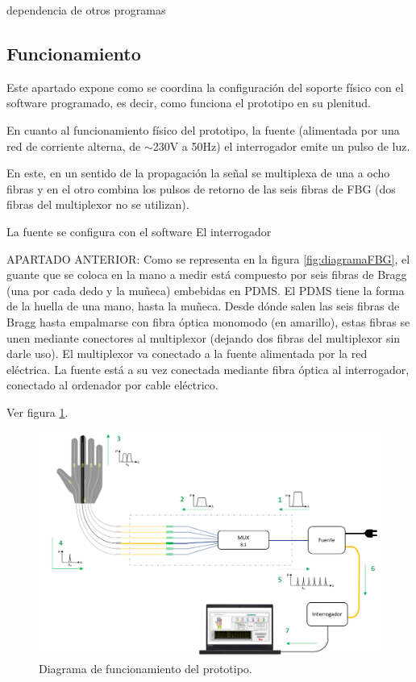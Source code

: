 






dependencia de otros programas


\subsection{Funcionamiento}
\label{sec:funcionamiento3}


Este apartado expone como se coordina la configuración del soporte físico con el software programado, es decir, como funciona el prototipo en su plenitud.

En cuanto al funcionamiento físico del prototipo, la fuente  (alimentada por una red de corriente alterna, de $\sim$230V a 50Hz) el interrogador emite un pulso de luz. 



En este, en un sentido de la propagación la señal se multiplexa de una a ocho fibras y en el otro combina los pulsos de retorno de las seis fibras de FBG (dos fibras del multiplexor no se utilizan). 

La fuente se configura con el software 
El interrogador


APARTADO ANTERIOR: 	Como se representa en la figura \ref{fig:diagramaFBG}, el guante que se coloca en la mano a medir está compuesto por seis fibras de Bragg (una por cada dedo y la muñeca) embebidas en PDMS. El PDMS tiene la forma de la huella de una mano, hasta la muñeca. Desde dónde salen las seis fibras de Bragg hasta empalmarse con fibra óptica monomodo (en amarillo), estas fibras se unen mediante conectores al multiplexor (dejando dos fibras del multiplexor sin darle uso). El multiplexor va conectado a la fuente alimentada por la red eléctrica. La fuente está a su vez conectada mediante fibra óptica al interrogador, conectado al ordenador por cable eléctrico.

Ver figura \ref{fig:diagramaFBGfuncionamiento}.

\begin{figure}[H]
	\centering
	\includegraphics[width=1\textwidth]{./img/diagramaFBGfuncionamiento}
	\caption{Diagrama de funcionamiento del prototipo.} \label{fig:diagramaFBGfuncionamiento}
\end{figure}



